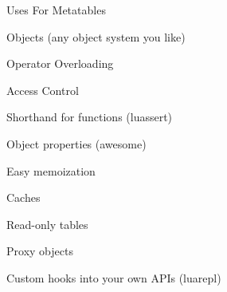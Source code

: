 
\begin{itemslide}{Uses For Metatables}
\item Objects (any object system you like)
\item Operator Overloading
\item Access Control
\item Shorthand for functions (luassert)
\item Object properties (awesome)
\item Easy memoization
\item Caches
\item Read-only tables
\item Proxy objects
\item Custom hooks into your own APIs (luarepl)
\end{itemslide}
